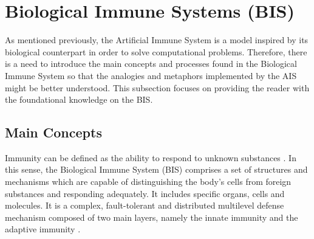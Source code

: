 




\section{Biological Immune Systems (BIS)} \label{sec:bgais}

As mentioned previously, the Artificial Immune System is a model inspired by its biological counterpart in order to solve computational problems. Therefore, there is a need to introduce the main concepts and processes found in the Biological Immune System so that the analogies and metaphors implemented by the AIS might be better understood. This subsection focuses on providing the reader with the foundational knowledge on the BIS. 

\subsection{Main Concepts} \label{sec:bgBISOverview}

Immunity can be defined as the ability to respond to unknown substances \cite{ICBook2009}. In this sense, the Biological Immune System (BIS) comprises a set of structures and mechanisms which are capable of distinguishing the body's cells from foreign substances and responding adequately. It includes specific organs, cells and molecules. It is a complex, fault-tolerant and distributed multilevel defense mechanism composed of two main layers, namely the innate immunity and the adaptive immunity \cite{Kuby2019}. 


